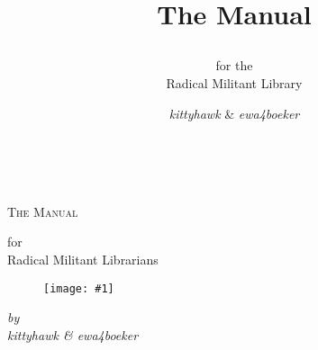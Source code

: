 \documentclass[english,11pt,paper=a4,DIV=calc]{scrartcl}
\title{
\begin{figure}[htbp]
\centering
\scalegraphics{ss00.png}
\end{figure}
\vspace{3cm}
The Manual}
\subtitle{for the\\Radical Militant Library}
\author{\emph{kittyhawk} \& \emph{ewa4boeker}}
\date{}%
\newlength{\imgwidth}
\newlength{\imgwidthmax}
\newcommand\scalegraphics[1]{%
    \settowidth{\imgwidth}{\texttt{[image: \#1]}}%
    \setlength{\imgwidth}{\minof{\imgwidthmax}{\minof{\imgwidth}{\textwidth}}}%
    \texttt{[image: \#1]}%
}
\begin{document}
\begin{titlepage}
	\centering
\hspace{1cm}\\
\vfill
	{\scshape\Huge The Manual \par}
	\vspace{1cm}
	{\Large for\\Radical Militant Librarians \par}
	
\vfill

\begin{figure}[htbp]
\centering
\scalegraphics{ss00.png}
\end{figure}

	\vspace{3cm}
	\emph{by\\%
		\vspace{1em}
		\emph{kittyhawk} \& \emph{ewa4boeker}
	}

\newpage

\end{titlepage}


\tableofcontents


\end{document}
